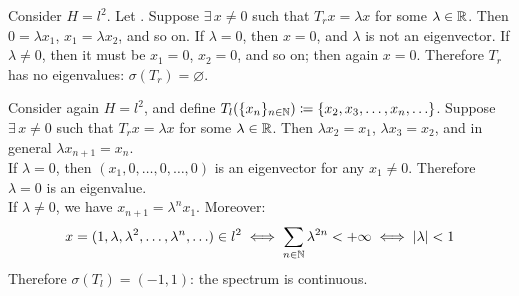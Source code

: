\begin{exam}
	Consider $H=l^2$. Let . Suppose $\exists \, x \neq 0$ such that $T_rx = \lambda x$ for some $\lambda \in \mathbb R$. Then $0 = \lambda x_1$, $x_1 = \lambda x_2$, and so on. If $\lambda = 0$, then $x = 0$, and $\lambda$ is not an eigenvector. If $\lambda \neq 0$, then it must be $x_1 = 0$, $x_2 = 0$, and so on; then again $x = 0$. Therefore $T_r$ has no eigenvalues: $\sigma(T_r) = \varnothing$.
\end{exam}

\begin{exam}
	Consider again $H= l^2$, and define $T_l(\{x_n\}_{n \in \mathbb N}) \coloneqq \{x_2, x_3, \ldots, x_n, \ldots \}$.
	Suppose $\exists \, x \neq 0$ such that $T_rx = \lambda x$ for some $\lambda \in \mathbb R$. Then $\lambda x_2= x_1$, $\lambda x_3= x_2$, and in general $\lambda x_{n+1} = x_n$. \\
	If $\lambda = 0$, then $(x_1, 0, \ldots, 0, \ldots, 0)$ is an eigenvector for any $x_1 \neq 0$. Therefore $\lambda =0$ is an eigenvalue.\\
	If $\lambda \neq 0$, we have $x_{n+1} = \lambda^n x_1$. Moreover:
	$$x=(1,\lambda, \lambda^2, \ldots, \lambda^n, \ldots) \in l^2
	\iff \sum_{n \in \mathbb N}\lambda^{2n} < +\infty \iff |\lambda| < 1$$
	Therefore $\sigma(T_l)=(-1,1)$: the spectrum is continuous.
\end{exam}
